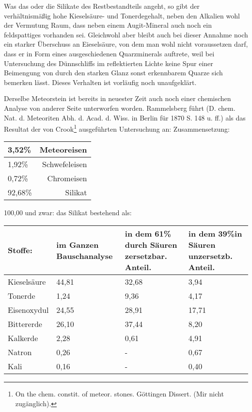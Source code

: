 \documentclass[a4paper, 11pt, oneside]{article}
\begin{document}
Was das oder die Silikate des Restbestandteils angeht, so gibt der verhältnismäßig hohe Kieselsäure- und Tonerdegehalt, neben den Alkalien wohl der Vermutung Raum, dass neben einem Augit-Mineral auch noch ein feldspattiges vorhanden sei. Gleichwohl aber bleibt auch bei dieser Annahme noch ein starker Überschuss an Eieselsäure, von dem man wohl nicht voraussetzen darf, dass er in Form eines ausgeschiedenen Quarzminerals auftrete, weil bei Untersuchung des Dünnschliffs im reflektierten Lichte keine Spur einer Beimengung von durch den starken Glanz sonst erkennbarem Quarze sich bemerken lässt. Dieses Verhalten ist vorläufig noch unaufgeklärt.

Derselbe Meteorstein ist bereits in neuester Zeit auch noch einer chemischen Analyse von anderer Seite unterworfen worden. Rammelsberg führt (D. chem. Nat. d. Meteoriten Abh. d. Acad. d. Wiss. in Berlin für 1870 S. 148 u. ff.) als das Resultat der von Crook\footnote{On the chem. constit. of meteor. stones. Göttingen Dissert. (Mir nicht zugänglich).} ausgeführten Untersuchung an: Zusammensetzung:
\begin{center}
    \begin{tabular}{ |l|r| } 
    \hline
    3,52\% & Meteoreisen\\\hline
    1,92\% & Schwefeleisen\\\hline
    0,72\% & Chromeisen\\\hline
    92,68\% & Silikat\\
    \hline
    \end{tabular}
\end{center}
100,00 und zwar:
das Silikat bestehend als:
\begin{center}
\begin{tabular}{ |p{20mm}|p{24mm}|p{31mm}|p{32mm}| }
    \hline
    Stoffe: & im Ganzen Bauschanalyse & in dem 61\% durch Säuren zersetzbar. Anteil. & in dem 39\%\newline in Säuren unzersetzb. Anteil.\\
    \hline\hline
    Kieselsäure & 44,81 & 32,68 & 3,94\\\hline
    Tonerde & 1,24 & 9,36 & 4,17\\\hline
    Eisenoxydul & 24,55 & 28,91 & 17,71\\\hline
    Bittererde & 26,10 & 37,44 & 8,20\\\hline
    Kalkerde & 2,28 & 0,61 & 4,91\\\hline
    Natron & 0,26 & - & 0,67\\\hline
    Kali & 0,16 & - & 0,40\\
    \hline
\end{tabular}
\end{center}
\end{document}
